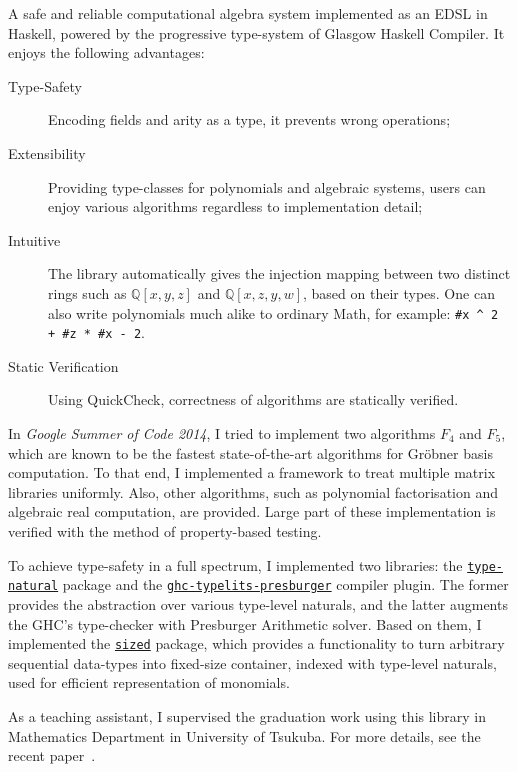\documentclass{moderncv}
\begin{document}
 \vspace{.5em}
 A safe and reliable computational algebra system implemented as an EDSL in Haskell, powered by the progressive type-system of Glasgow Haskell Compiler.
 It enjoys the following advantages:
 \begin{description}
  \item[Type-Safety] Encoding fields and arity as a type, it prevents wrong operations;
  \item[Extensibility] Providing type-classes for polynomials and algebraic systems, users can enjoy various algorithms regardless to implementation detail;
  \item[Intuitive] The library automatically gives the injection mapping between two distinct rings such as $\mathbb{Q}[x, y, z]$ and $\mathbb{Q}[x,z,y, w]$, based on their types.
             One can also write polynomials much alike to ordinary Math, for example: \verb|#x ^ 2 + #z * #x - 2|.
  \item[Static Verification] 
     Using QuickCheck, correctness of algorithms are statically verified.
 \end{description}

 In \emph{Google Summer of Code 2014}, I tried to implement two algorithms $F_4$ and $F_5$, which are known to be the fastest state-of-the-art algorithms for Gr\"{o}bner basis computation.
 To that end, I implemented a framework to treat multiple matrix libraries uniformly.
 Also, other algorithms, such as polynomial factorisation and algebraic real computation, are provided.
 Large part of these implementation is verified with the method of property-based testing.

 To achieve type-safety in a full spectrum, I implemented two libraries: the \href{http://hackage.haskell.org/package/type-natural}{\texttt{type-natural}} package and the \href{http://hackage.haskell.org/package/ghc-typelits-presburger}{\texttt{ghc-typelits-presburger}} compiler plugin.
 The former provides the abstraction over various type-level naturals, and the latter augments the GHC's type-checker with Presburger Arithmetic solver.
 Based on them, I implemented the \href{http://hackage.haskell.org/package/sized}{\texttt{sized}} package, which provides a functionality to turn arbitrary sequential data-types into fixed-size container, indexed with type-level naturals, used for efficient representation of monomials.

 As a teaching assistant, I supervised the graduation work using this library in Mathematics Department in University of Tsukuba.
 For more details, see the recent paper~\cite{ISHII:2018ek}.
\end{document}
